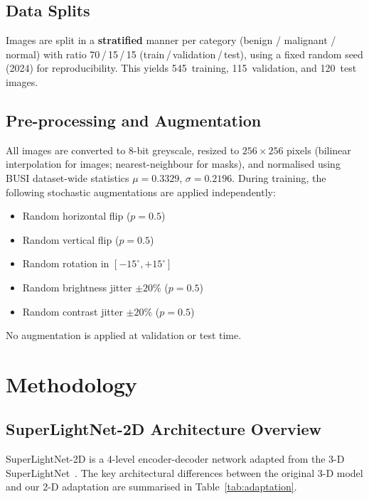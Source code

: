 \documentclass[conference]{IEEEtran}
\begin{document}
\subsection{Data Splits}

Images are split in a \textbf{stratified} manner per category
(benign / malignant / normal) with ratio 70\,/\,15\,/\,15
(train\,/\,validation\,/\,test), using a fixed random seed (2024)
for reproducibility. This yields 545~training, 115~validation, and
120~test images.

\subsection{Pre-processing and Augmentation}

All images are converted to 8-bit greyscale, resized to
$256{\times}256$ pixels (bilinear interpolation for images;
nearest-neighbour for masks), and normalised using BUSI dataset-wide
statistics $\mu{=}0.3329$, $\sigma{=}0.2196$. During training, the
following stochastic augmentations are applied independently:

\begin{itemize}
  \item Random horizontal flip ($p{=}0.5$)
  \item Random vertical flip ($p{=}0.5$)
  \item Random rotation in $[-15^\circ, +15^\circ]$
  \item Random brightness jitter $\pm 20\%$ ($p{=}0.5$)
  \item Random contrast jitter $\pm 20\%$ ($p{=}0.5$)
\end{itemize}

No augmentation is applied at validation or test time.

\section{Methodology}

\subsection{SuperLightNet-2D Architecture Overview}

SuperLightNet-2D is a 4-level encoder-decoder network adapted from
the 3-D SuperLightNet~\cite{yu2025superlightnet}. The key
architectural differences between the original 3-D model and our
2-D adaptation are summarised in Table~\ref{tab:adaptation}.
\end{document}
